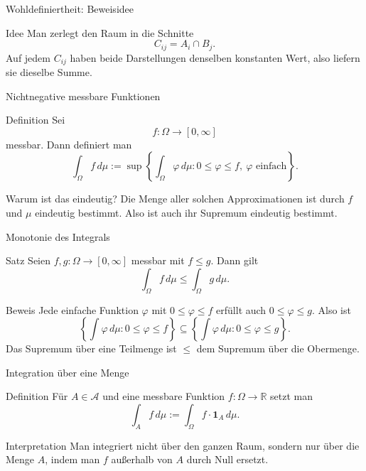 \documentclass{beamer}
\begin{document}
\begin{frame}{Wohldefiniertheit: Beweisidee}
\begin{block}{Idee}
Man zerlegt den Raum in die Schnitte
\[
C_{ij}=A_i\cap B_j.
\]
Auf jedem \(C_{ij}\) haben beide Darstellungen denselben konstanten Wert, also liefern sie dieselbe Summe.
\end{block}
\end{frame}

\begin{frame}{Nichtnegative messbare Funktionen}
\begin{block}{Definition}
Sei
\[
f\colon \Omega\to[0,\infty]
\]
messbar.
Dann definiert man
\[
\int_\Omega f\,d\mu
:=
\sup\left\{
\int_\Omega \varphi\,d\mu :
0\le \varphi\le f,\ \varphi \text{ einfach}
\right\}.
\]
\end{block}

\begin{block}{Warum ist das eindeutig?}
Die Menge aller solchen Approximationen ist durch \(f\) und \(\mu\) eindeutig bestimmt. Also ist auch ihr Supremum eindeutig bestimmt.
\end{block}
\end{frame}

\begin{frame}{Monotonie des Integrals}
\begin{block}{Satz}
Seien \(f,g\colon\Omega\to[0,\infty]\) messbar mit \(f\le g\). Dann gilt
\[
\int_\Omega f\,d\mu\le\int_\Omega g\,d\mu.
\]
\end{block}

\begin{block}{Beweis}
Jede einfache Funktion \(\varphi\) mit \(0\le\varphi\le f\) erfüllt auch \(0\le\varphi\le g\). Also ist
\[
\left\{\int\varphi\,d\mu : 0\le\varphi\le f\right\}
\subseteq
\left\{\int\varphi\,d\mu : 0\le\varphi\le g\right\}.
\]
Das Supremum über eine Teilmenge ist \(\le\) dem Supremum über die Obermenge.
\end{block}
\end{frame}

\begin{frame}{Integration über eine Menge}
\begin{block}{Definition}
Für \(A\in\mathcal A\) und eine messbare Funktion \(f\colon\Omega\to\mathbb R\) setzt man
\[
\int_A f\,d\mu
:=
\int_\Omega f\cdot\mathbf 1_A\,d\mu.
\]
\end{block}

\begin{block}{Interpretation}
Man integriert nicht über den ganzen Raum, sondern nur über die Menge \(A\), indem man \(f\) außerhalb von \(A\) durch Null ersetzt.
\end{block}
\end{frame}
\end{document}
